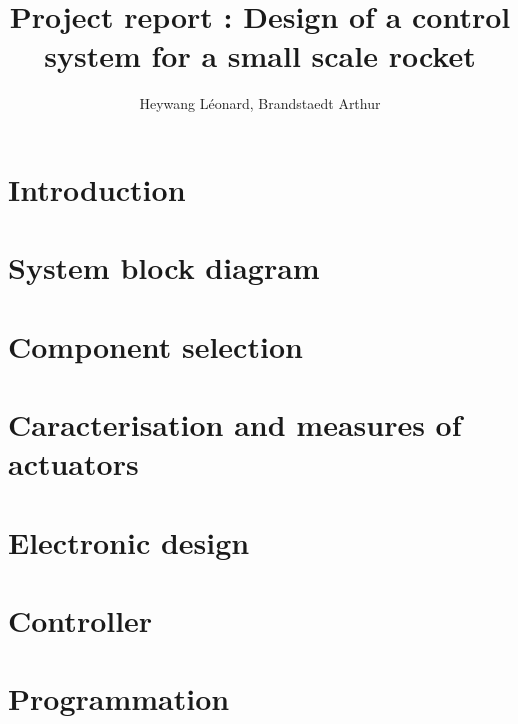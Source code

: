 \documentclass[twoside]{report}
\author{Heywang Léonard, Brandstaedt Arthur}
\title{Project report : Design of a control system for a small scale rocket}
\date{\DTMtoday}
\begin{document}
\fontsize{9}{10.5}





\tableofcontents
\listoffigures
\listoftables

\newpage
\chapter*{Introduction}

\chapter*{System block diagram}

\newpage


\chapter{Component selection}


\chapter{Caracterisation and measures of actuators}


% 

\chapter{Electronic design}


\chapter{Controller}


\chapter{Programmation}

\end{document}
